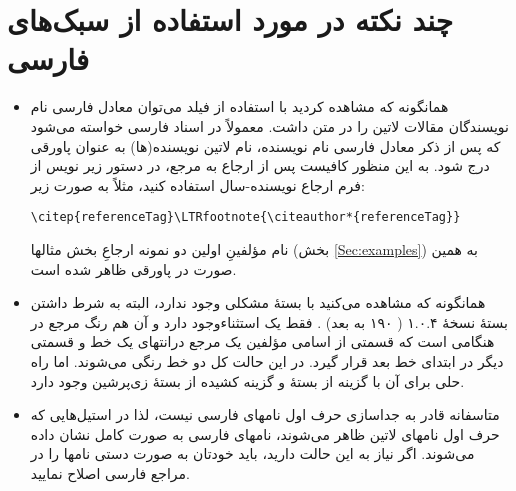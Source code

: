 \documentclass{article}
\theoremstyle{plain}\newtheorem{question}{پرسش}
\begin{document}
\section{چند نکته در مورد استفاده از سبک‌های فارسی}
\begin{itemize}
\item همانگونه که مشاهده کردید با استفاده از فیلد  می‌توان معادل فارسی نام نویسندگان مقالات لاتین را در متن داشت. معمولاً در اسناد فارسی خواسته می‌شود که پس از ذکر معادل فارسی نام نویسنده، نام لاتین نویسنده(ها) به عنوان پاورقی درج شود. به این منظور کافیست پس از ارجاع به مرجع، در دستور زیر نویس از فرم ارجاع نویسنده-سال  استفاده کنید، مثلاً به صورت زیر:
\begin{latin}
\begin{verbatim}
\citep{referenceTag}\LTRfootnote{\citeauthor*{referenceTag}}
\end{verbatim}
\end{latin}
  نام مؤلفینِ اولین دو نمونه ارجاعِ بخش مثالها (بخش \ref{Sec:examples}) به همین‌ صورت در پاورقی ظاهر شده است.
 
\item همانگونه که مشاهده می‌کنید با بستهٔ  مشکلی وجود ندارد، البته به شرط داشتن بستهٔ نسخهٔ ۱.۰.۴ ( ۱۹۰ به بعد) . فقط یک استثناءوجود دارد و آن هم رنگ مرجع در هنگامی است که  قسمتی از اسامی مؤلفین یک مرجع درانتهای یک خط و قسمتی دیگر در ابتدای خط بعد قرار گیرد. در این حالت کل دو خط رنگی می‌شوند. اما راه حلی برای آن با  گزینه   از بستهٔ  و گزینه  کشیده  از بستهٔ زی‌پرشین وجود دارد.


\item متاسفانه  قادر به جداسازی حرف اول نامهای فارسی نیست، لذا در استیل‌‌هایی که حرف اول نامهای لاتین ظاهر می‌شوند، نامهای فارسی به صورت کامل نشان داده می‌شوند. اگر نیاز به این حالت دارید، باید خودتان به صورت دستی نامها را در مراجع فارسی اصلاح نمایید.


\end{itemize}
\end{document}
